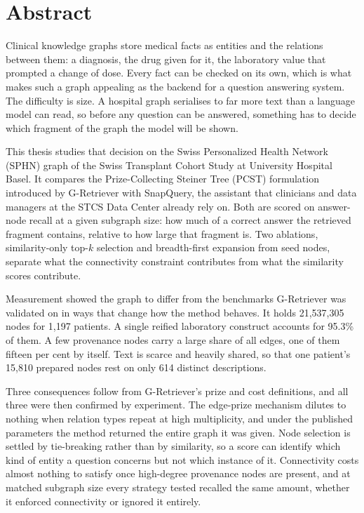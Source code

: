 \chapter{Abstract}


Clinical knowledge graphs store medical facts as entities and the relations
between them: a diagnosis, the drug given for it, the laboratory value that
prompted a change of dose. Every fact can be checked on its own, which is what
makes such a graph appealing as the backend for a question answering system. The
difficulty is size. A hospital graph serialises to far more text than a language
model can read, so before any question can be answered, something has to decide
which fragment of the graph the model will be shown.

This thesis studies that decision on the Swiss Personalized Health Network (SPHN)
graph of the Swiss Transplant Cohort Study at University Hospital Basel. It
compares the Prize-Collecting Steiner Tree (PCST) formulation introduced by
G-Retriever with SnapQuery, the assistant that clinicians and data managers at
the STCS Data Center already rely on. Both are scored on answer-node recall at a
given subgraph size: how much of a correct answer the retrieved fragment
contains, relative to how large that fragment is. Two ablations, similarity-only
top-$k$ selection and breadth-first expansion from seed nodes, separate what the
connectivity constraint contributes from what the similarity scores contribute.

Measurement showed the graph to differ from the benchmarks G-Retriever was
validated on in ways that change how the method behaves. It holds 21{,}537{,}305
nodes for 1{,}197 patients. A single reified laboratory construct accounts for
95.3\% of them. A few provenance nodes carry a large share of all edges, one of
them fifteen per cent by itself. Text is scarce and heavily shared, so that one
patient's 15{,}810 prepared nodes rest on only 614 distinct descriptions.

Three consequences follow from G-Retriever's prize and cost definitions, and all
three were then confirmed by experiment. The edge-prize mechanism dilutes to
nothing when relation types repeat at high multiplicity, and under the published
parameters the method returned the entire graph it was given. Node selection is
settled by tie-breaking rather than by similarity, so a score can identify which
kind of entity a question concerns but not which instance of it. Connectivity
costs almost nothing to satisfy once high-degree provenance nodes are present,
and at matched subgraph size every strategy tested recalled the same amount,
whether it enforced connectivity or ignored it entirely.

